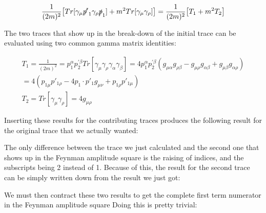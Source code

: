\documentclass[a4]{article}
\begin{document}
    \begin{equation}
        \frac{1}{(2m)^2} \big[ Tr[\gamma_\mu \slashed{p'}_1 \gamma_\rho \slashed{p}_1] + m^2 Tr[\gamma_\mu \gamma_\rho] \big] = \frac{1}{(2m)^2} \big[ T_1 + m^2 T_2 \big]
    \end{equation}

    The two traces that show up in the break-down of the initial trace can be evaluated using two common gamma matrix identities:

    \begin{eqnarray}
        T_1 = \frac{1}{(2m)^2} = p_1^{\alpha} p_2^{'\beta} Tr [\gamma_\mu \gamma_\rho \gamma_\alpha \gamma_\beta] = 4 p_1^{\alpha} p_2^{'\beta} (g_{\mu \alpha} g_{\rho \beta} - g_{\mu \rho} g_{\alpha \beta} + g_{\mu \beta} g_{\alpha \rho}) \\
        = 4 (p_{1 \mu} p'_{1 \rho} - 4 p_1 \cdot p'_1 g_{\mu \nu} + p_{1 \rho} p'_{1 \mu}) \\ 
        T_2 = Tr [\gamma_\mu \gamma_\rho] = 4 g_{\mu \rho}
    \end{eqnarray}

    Inserting these results for the contributing traces produces the following result for the original trace that we actually wanted:

    \begin{center}
    \end{center}

    The only difference between the trace we just calculated and the second one that shows up in the Feynman amplitude square is the raising of indices, and the subscripts being 2 instead of 1. Because of this, the result for the second trace can be
    simply written down from the result we just got:

    \begin{center}
    \end{center}

    We must then contract these two results to get the complete first term numerator in the Feynman amplitude square Doing this is pretty trivial: 
\end{document}
